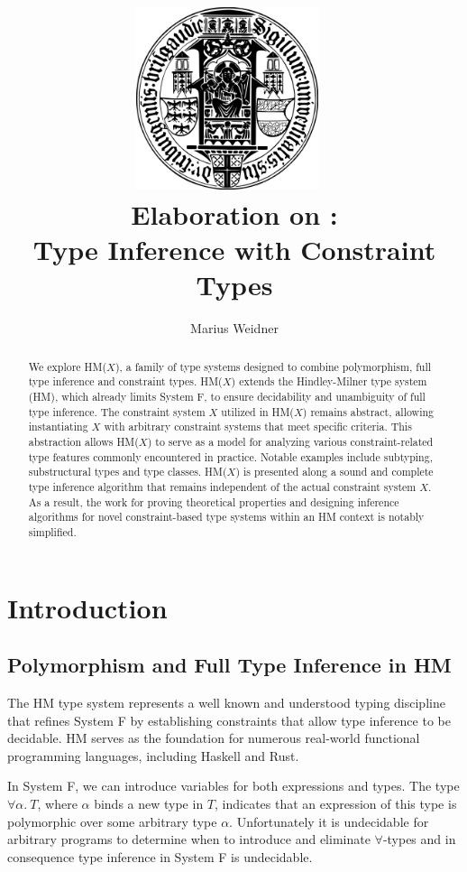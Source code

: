 \documentclass[runningheads]{llncs}
\title{\includegraphics[width=0.4\textwidth]{logo.png}~\\[1cm] Elaboration on
  \hmx:\\Type Inference with Constraint Types}
\institute{Chair of Programming Languages, University of Freiburg \\
  \email{weidner@cs.uni-freiburg.de}}
\author{Marius Weidner}
\newcommand{\hmx}{HM($X$)}
\begin{document}
\let\oldaddcontentsline\addcontentsline{}
\def\addcontentsline#1#2#3{}
\maketitle
\def\addcontentsline#1#2#3{\oldaddcontentsline{#1}{#2}{#3}}

\begin{abstract}
  We explore \hmx{}\cite{hmx}, a family of type systems designed to
  combine
  polymorphism, full type inference and constraint types.
  \hmx{} extends the Hindley-Milner type system (HM)\cite{hm}, which already
  limits
  System F, to ensure decidability and unambiguity of full type inference.
  The constraint system $X$ utilized in \hmx{} remains abstract, allowing
  instantiating $X$ with arbitrary constraint systems that meet specific
  criteria.
  This abstraction allows \hmx{} to serve as a model for analyzing various
  constraint-related type features commonly encountered in practice.
  Notable examples include subtyping, substructural
  types and type classes.
  \hmx{} is presented along a sound and complete type inference algorithm that
  remains
  independent of the actual constraint system
  $X$.
  As a result, the work for proving theoretical properties and designing
  inference algorithms for novel constraint-based type systems within an
  HM context is notably simplified.
\end{abstract}

\setcounter{tocdepth}{2}
\tableofcontents
\newpage

\section{Introduction}

\subsection{Polymorphism and Full Type Inference in HM}
The HM type system represents a well known and understood typing discipline
that
refines System F by establishing constraints that allow type inference
to be decidable.
HM serves as the foundation for numerous real-world functional programming
languages, including Haskell and Rust.

In System F, we can introduce variables for both expressions and types.
The type $∀α. \ T$, where $α$ binds a new type in $T$,
indicates that an expression of this type is polymorphic over some
arbitrary type $α$.
Unfortunately it is undecidable for arbitrary programs to determine when to
introduce and eliminate $∀$-types and in consequence type inference in System F
is undecidable\cite{sysf}.
\end{document}
